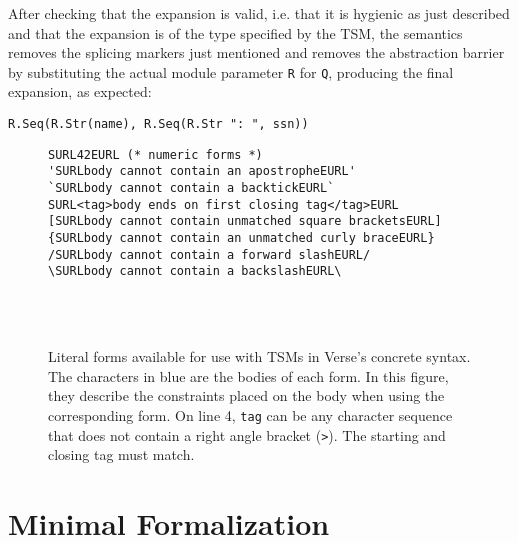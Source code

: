 After checking that the expansion is valid, i.e. that it is hygienic as just described and that the expansion is of the type specified by the TSM, the semantics removes the splicing markers just mentioned and removes the abstraction barrier by substituting  the actual module parameter \lstinline{R} for \lstinline{Q}, producing the final expansion, as expected:
\begin{lstlisting}[numbers=none]
R.Seq(R.Str(name), R.Seq(R.Str ": ", ssn))\end{lstlisting}
\begin{figure}
\begin{lstlisting}
SURL42EURL (* numeric forms *)
'SURLbody cannot contain an apostropheEURL'
`SURLbody cannot contain a backtickEURL`
SURL<tag>body ends on first closing tag</tag>EURL
[SURLbody cannot contain unmatched square bracketsEURL]
{SURLbody cannot contain an unmatched curly braceEURL}
/SURLbody cannot contain a forward slashEURL/
\SURLbody cannot contain a backslashEURL\

\end{lstlisting}
\\
\\
\caption{Literal forms available for use with TSMs in Verse's concrete syntax. The characters in blue are the bodies of each form. In this figure, they describe the constraints placed on the body when using the corresponding form. On line 4, \texttt{tag} can be any character sequence that does not contain a right angle bracket (\texttt{>}). The starting and closing tag must match.}
\label{fig:Body-defn}
\end{figure}

\section{Minimal Formalization}\label{sec:tsms-minimal-formalism}

